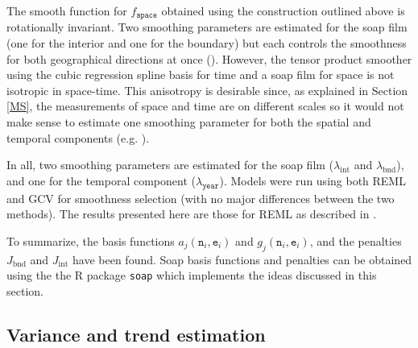 The smooth function for $f_\texttt{space}$ obtained using the construction outlined above is rotationally invariant. Two smoothing parameters are estimated for the soap film (one for the interior and one for the boundary) but each controls the smoothness for both geographical directions at once (\cite{soap}). However, the tensor product smoother using the cubic regression spline basis for time and a soap film for space is not isotropic in space-time. This anisotropy is desirable since, as explained in Section \ref{MS}, the measurements of space and time are on different scales so it would not make sense to estimate one smoothing parameter for both the spatial and temporal components (e.g. \cite[p. 162]{simonbook}).
 
 In all, two smoothing parameters are estimated for the soap film ($\lambda_\text{int}$ and $\lambda_\text{bnd}$), and one for the temporal component ($\lambda_\texttt{year}$). Models were run using both REML and GCV for smoothness selection (with no major differences between the two methods). The results presented here are those for REML as described in .
 
To summarize, the basis functions $a_j(\texttt{n}_i,\texttt{e}_i)$ and $g_j(\texttt{n}_i,\texttt{e}_i)$, and the penalties $J_\text{bnd}$ and $J_\text{int}$ have been found. Soap basis functions and penalties can be obtained using the the \textsf{R} package \texttt{soap} which implements the ideas discussed in this section.

\subsection{Variance and trend estimation \label{VE}}

